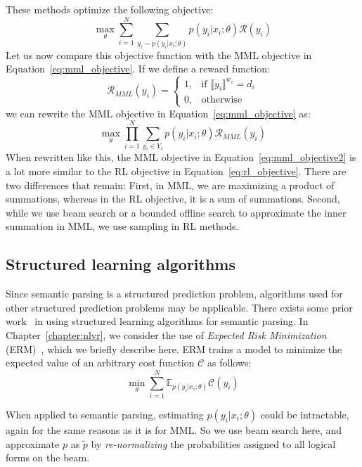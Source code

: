 These methods optimize the following objective:
\begin{equation}
	\max_{\theta} \sum_{i=1}^N \sum_{y_i \sim p(y_i|x_i;\theta)} p(y_i|x_i;\theta) \mathcal{R}(y_i)
	\label{eq:rl_objective}
\end{equation}
Let us now compare this objective function with the MML objective in
Equation~\ref{eq:mml_objective}. If we define a reward function:
\begin{equation}
	\mathcal{R}_{MML}(y_i) = 
	\begin{cases}
		1, & \text{if } \llbracket y_i \rrbracket^{w_i} = d_i\\
		0, & \text{otherwise}
	\end{cases}
	\label{eq:mml_reward}
\end{equation}
we can rewrite the MML objective in Equation~\ref{eq:mml_objective} as:
\begin{equation}	
	\max_{\theta} \prod_{i=1}^N \sum_{y_i \in Y_i} p(y_i|x_i;\theta)
	\mathcal{R}_{MML}(y_i)
	\label{eq:mml_objective2}
\end{equation}
When rewritten like this, the MML objective in Equation~\ref{eq:mml_objective2} is a lot more
similar to the RL objective in Equation~\ref{eq:rl_objective}. There are two
differences that remain: First, in MML, we are maximizing a product of summations,
whereas in the RL objective, it is a sum of summations. Second, while we use
beam search or a bounded offline search to approximate the inner summation in
MML, we use sampling in RL methods.

\subsection{Structured learning algorithms}\label{sec:erm}
Since semantic parsing is a structured prediction problem, algorithms used for
other structured prediction problems may be applicable. 
There exists some prior work~\citep{IyyerSQA2016,guu2017bridging} in using 
structured learning algorithms for semantic parsing. In
Chapter~\ref{chapter:nlvr}, we consider the use of
\emph{Expected Risk Minimization} (ERM)~\citep{smith2006minimum}, which we
briefly describe here.  ERM trains a model to minimize the
expected value of an arbitrary cost function $\mathcal{C}$ as follows:
\begin{equation}
\min_{\theta} \sum_{i=1}^{N} \mathbb{E}_{p(y_i|x_i;
\theta)}\mathcal{C}(y_i) \label{eq:erm_objective}
\end{equation}

\noindent When applied to semantic parsing, estimating $p(y_i|x_i; \theta)$
could be intractable, again for the same reasons as it is for MML\@. So we use
beam search here, and approximate $p$ as $\tilde{p}$ by \emph{re-normalizing}
the probabilities assigned to all logical forms on the beam.

